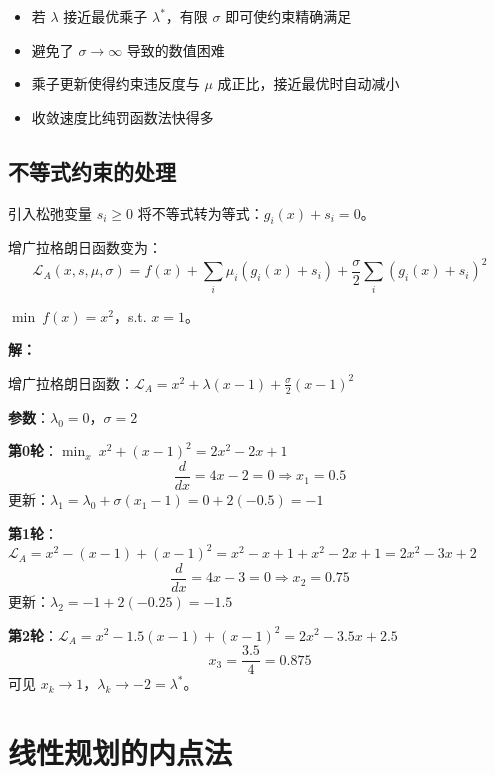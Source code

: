 \begin{notebox}[增广拉格朗日法的优势]
\begin{itemize}[itemsep=0.3em]
    \item 若 $\lambda$ 接近最优乘子 $\lambda^*$，有限 $\sigma$ 即可使约束精确满足
    \item 避免了 $\sigma \to \infty$ 导致的数值困难
    \item 乘子更新使得约束违反度与 $\mu$ 成正比，接近最优时自动减小
    \item 收敛速度比纯罚函数法快得多
\end{itemize}
\end{notebox}

\subsection{不等式约束的处理}

引入松弛变量 $s_i \geq 0$ 将不等式转为等式：$g_i(x) + s_i = 0$。

增广拉格朗日函数变为：
\[
\mathcal{L}_A(x, s, \mu, \sigma) = f(x) + \sum_i \mu_i(g_i(x) + s_i) + \frac{\sigma}{2}\sum_i (g_i(x) + s_i)^2
\]

\begin{example}\label{ex:alm}
$\min\ f(x) = x^2$，s.t. $x = 1$。

\textbf{解：}

增广拉格朗日函数：$\mathcal{L}_A = x^2 + \lambda(x-1) + \frac{\sigma}{2}(x-1)^2$

\textbf{参数}：$\lambda_0 = 0$，$\sigma = 2$

\textbf{第0轮}：$\min_x\ x^2 + (x-1)^2 = 2x^2 - 2x + 1$
\[
\frac{d}{dx} = 4x - 2 = 0 \Rightarrow x_1 = 0.5
\]
更新：$\lambda_1 = \lambda_0 + \sigma(x_1 - 1) = 0 + 2(-0.5) = -1$

\textbf{第1轮}：$\mathcal{L}_A = x^2 - (x-1) + (x-1)^2 = x^2 - x + 1 + x^2 - 2x + 1 = 2x^2 - 3x + 2$
\[
\frac{d}{dx} = 4x - 3 = 0 \Rightarrow x_2 = 0.75
\]
更新：$\lambda_2 = -1 + 2(-0.25) = -1.5$

\textbf{第2轮}：$\mathcal{L}_A = x^2 - 1.5(x-1) + (x-1)^2 = 2x^2 - 3.5x + 2.5$
\[
x_3 = \frac{3.5}{4} = 0.875
\]
可见 $x_k \to 1$，$\lambda_k \to -2 = \lambda^*$。
\end{example}

\section{线性规划的内点法}\label{sec:interior-point-lp}

